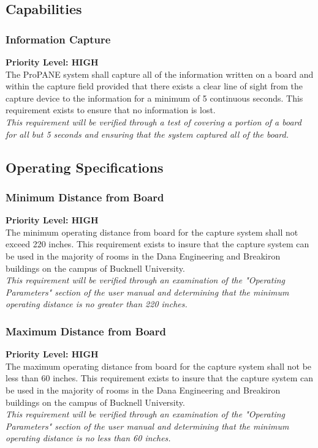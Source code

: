 \documentclass[]{article}
\begin{document}
		\subsection{Capabilities}
			
			\subsubsection{Information Capture}
				\textbf{Priority Level: HIGH}\\
				The ProPANE system shall capture all of the information written on a board and within the capture field provided that there exists a clear line of sight from the capture device to the information for a minimum of 5 continuous seconds. This requirement exists to ensure that no information is lost.\\
				\emph{This requirement will be verified through a test of covering a portion of a board for all but 5 seconds and ensuring that the system captured all of the board. }
	
	
		\subsection{Operating Specifications}
			
			\subsubsection{Minimum Distance from Board}
				\textbf{Priority Level: HIGH}\\
				The minimum operating distance from board for the capture system shall not exceed 220 inches. This requirement exists to insure that the capture system can be used in the majority of rooms in the Dana Engineering and Breakiron buildings on the campus of Bucknell University.\\
				\emph{This requirement will be verified through an examination of the "Operating Parameters" section of the user manual and determining that the minimum operating distance is no greater than 220 inches.}
				
			
			\subsubsection{Maximum Distance from Board}
				\textbf{Priority Level: HIGH}\\
				The maximum operating distance from board for the capture system shall not be less than 60 inches. This requirement exists to insure that the capture system can be used in the majority of rooms in the Dana Engineering and Breakiron buildings on the campus of Bucknell University.\\
				\emph{This requirement will be verified through an examination of the "Operating Parameters" section of the user manual and determining that the minimum operating distance is no less than 60 inches.}
		
\end{document}

